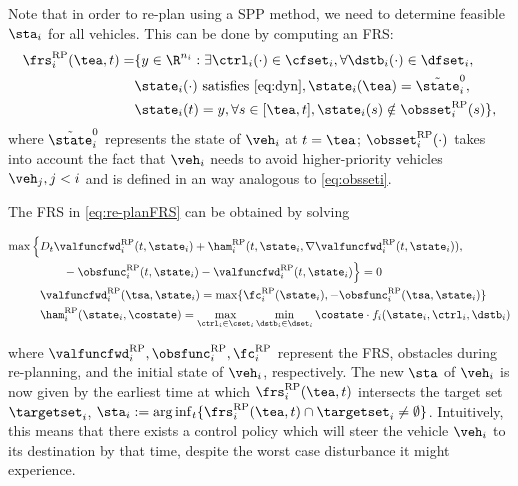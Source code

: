 Note that in order to re-plan using a SPP method, we need to determine feasible $\sta_i$ for all vehicles. This can be done by computing an FRS:
\begin{equation} \label{eq:re-planFRS}
\begin{aligned} 
\frs_i^{\text{RP}}(\tea, t) = & \{y \in \R^{n_i}: \exists \ctrl_i(\cdot) \in \cfset_i, \forall \dstb_i(\cdot) \in \dfset_i, \\
& \state_i(\cdot) \text{ satisfies \eqref{eq:dyn}}, \state_i(\tea) = \tilde{\state}_i^0, \\
& \state_i(t) = y, \forall s \in [\tea, t], \state_i(s) \notin \obsset_i^{\text{RP}}(s) \},
\end{aligned}
\end{equation}
\noindent where $\tilde{\state}_i^0$ represents the state of $\veh_i$ at $t = \tea$; $\obsset_i^{\text{RP}}(\cdot)$ takes into account the fact that $\veh_i$ needs to avoid higher-priority vehicles $\veh_j, j<i$ and is defined in an way analogous to \eqref{eq:obsseti}.

The FRS in \eqref{eq:re-planFRS} can be obtained by solving %

\begin{equation}
\begin{aligned}
\max \Big\{&D_t \valfuncfwd_i^{\text{RP}}(t, \state_i) + \ham_i^{\text{RP}}(t, \state_i, \nabla \valfuncfwd_i^{\text{RP}}(t, \state_i)), \\
&\qquad - \obsfunc_i^{\text{RP}}(t, \state_i) - \valfuncfwd_i^{\text{RP}}(t, \state_i) \Big\} = 0\\
&\valfuncfwd_i^{\text{RP}}(\tsa, \state_i) = \max\{\fc_i^{\text{RP}}(\state_i), -\obsfunc_i^{\text{RP}}(\tsa, \state_i)\} \\
&\ham_i^{\text{RP}}(\state_i, \costate) = \max_{\ctrl_i \in \cset_i} \min_{\dstb_i \in \dset_i} \costate \cdot f_i (\state_i, \ctrl_i, \dstb_i)
\end{aligned}
\end{equation} 

\noindent where $\valfuncfwd_i^{\text{RP}}, \obsfunc_i^{\text{RP}}, \fc_i^{\text{RP}}$ represent the FRS, obstacles during re-planning, and the initial state of $\veh_i$, respectively. The new $\sta$ of $\veh_i$ is now given by the earliest time at which $\frs_i^{\text{RP}}(\tea, t)$ intersects the target set $\targetset_i$, $\sta_i := \arg \inf_t \{ \frs_i^{\text{RP}}(\tea, t) \cap \targetset_i \neq \emptyset \}$. Intuitively, this means that there exists a control policy which will steer the vehicle $\veh_i$ to its destination by that time, despite the worst case disturbance it might experience.

